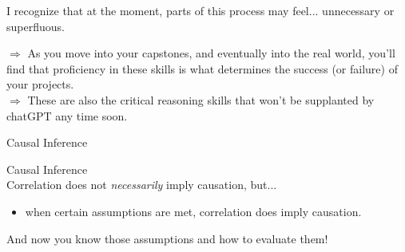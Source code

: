 \documentclass[11pt]{beamer}
\begin{document}
\begin{frame}[c]
I recognize that at the moment, parts of this process may feel... unnecessary or superfluous. \\
\vspace{0.2cm}

\pause $\Rightarrow$ As you move into your capstones, and eventually into the real world, you'll find that proficiency in these skills is what determines the success (or failure) of your projects. \\ 
\vspace{0.2cm}
\pause $\Rightarrow$ These are also the critical reasoning skills that won't be supplanted by chatGPT any time soon.
\end{frame}

\begin{frame}[c]{Causal Inference}
\end{frame}

\begin{frame}[c]{Causal Inference}
     \\
    \vspace*{0.2cm}
    \pause Correlation does not \emph{necessarily} imply causation, \alert{but...}
    \begin{itemize}
      \pause \item when certain assumptions are met, correlation does imply causation. 
    \end{itemize} 
    \pause And now \alert{you} know those assumptions and how to evaluate them!
\end{frame}
  



\end{document}

